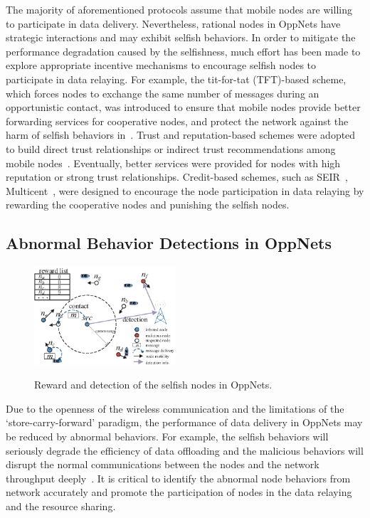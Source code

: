 The majority of aforementioned protocols
assume that mobile nodes are willing 
to participate in data delivery.
Nevertheless,
rational nodes in OppNets have strategic interactions
and may exhibit selfish behaviors.
In order to mitigate the performance degradation
caused by the selfishness,
much effort has been made to explore
appropriate incentive mechanisms
to encourage selfish nodes to
participate in data relaying.
For example, the tit-for-tat (TFT)-based scheme,
which forces nodes to exchange the same number
of messages during an opportunistic contact,
was introduced to ensure that 
mobile nodes provide better forwarding services 
for cooperative nodes,
and protect the network against the harm of selfish behaviors
in~\cite{DBLP:journals/tmc/MastronardePXLS16,
DBLP:journals/twc/HsuD17}.
Trust and reputation-based
schemes were adopted to build direct trust relationships
or indirect trust recommendations 
among mobile
nodes~\cite{DBLP:journals/tvt/ChenLWW16,DBLP:conf/mdm/JethawaM18}.
Eventually, better services were provided
for nodes with high reputation
or strong trust relationships.
Credit-based schemes, such as SEIR~\cite{DBLP:conf/ciss/ChhabraVS17},
Multicent~\cite{DBLP:journals/tpds/ChenSY15},
were designed to encourage the node participation
in data relaying 
by rewarding the cooperative nodes
and punishing the selfish nodes.

\subsection{Abnormal Behavior Detections in OppNets}
\begin{figure}
  \centering
  {\includegraphics[width=0.47\textwidth]{fig/sketch.eps}}
     \caption{Reward and detection of the selfish nodes in OppNets.}
     \label{fig:sketch}
\end{figure}
Due to the openness of
the wireless communication and the limitations of the
`store-carry-forward' paradigm,
the performance of data delivery in OppNets may be reduced
by abnormal behaviors.
For example,
the selfish behaviors will seriously degrade
the efficiency of data offloading
and the malicious behaviors
will disrupt the normal communications 
between the nodes and the network
throughput deeply~\cite{DBLP:journals/comsur/JedariXN18}.
It is critical to
identify the abnormal node behaviors from network accurately 
and promote the participation of nodes
in the data relaying and the resource sharing.

